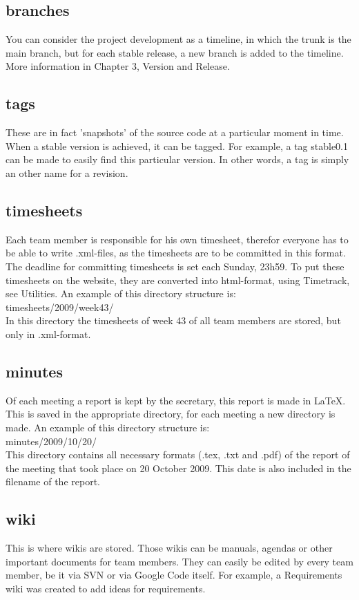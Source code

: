 \documentclass{report}
\begin{document}
\subsection{branches}
You can consider the project development as a timeline, in which the trunk is the main branch, but for each stable release, a new branch is added to the timeline.
More information in Chapter 3, Version and Release.
\subsection{tags}
These are in fact 'snapshots' of the source code at a particular moment in time.
When a stable version is achieved, it can be tagged.
For example, a tag stable0.1 can be made to easily find this particular version.
In other words, a tag is simply an other name for a revision.
\subsection{timesheets}
Each team member is responsible for his own timesheet, therefor everyone has to be able to write .xml-files, as the timesheets are to be committed in this format.
The deadline for committing timesheets is set each Sunday, 23h59.
To put these timesheets on the website, they are converted into html-format, using Timetrack, see Utilities.
An example of this directory structure is:\\
timesheets/2009/week43/\\
In this directory the timesheets of week 43 of all team members are stored, but only in .xml-format.
\subsection{minutes}
Of each meeting a report is kept by the secretary, this report is made in LaTeX.
This is saved in the appropriate directory, for each meeting a new directory is made.
An example of this directory structure is:\\
minutes/2009/10/20/\\
This directory contains all necessary formats (.tex, .txt and .pdf) of the report of the meeting that took place on 20 October 2009.
This date is also included in the filename of the report.
\subsection{wiki}
This is where wikis are stored.
Those wikis can be manuals, agendas or other important documents for team members.
They can easily be edited by every team member, be it via SVN or via Google Code itself.
For example, a Requirements wiki was created to add ideas for requirements.
\end{document}
